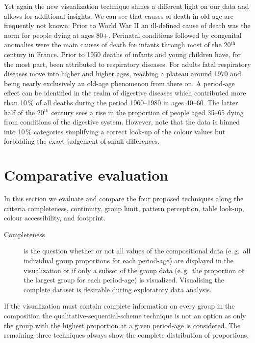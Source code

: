 \documentclass[parskip=half]{scrartcl}
\begin{document}
Yet again the new visualization technique shines a different light on our data and allows for additional insights. We can see that causes of death in old age are frequently not known: Prior to World War II an ill-defined cause of death was the norm for people dying at ages 80+. Perinatal conditions followed by congenital anomalies were the main causes of death for infants through most of the 20$^\text{th}$ century in France. Prior to 1950 deaths of infants and young children have, for the most part, been attributed to respiratory diseases. For adults fatal respiratory diseases move into higher and higher ages, reaching a plateau around 1970 and being nearly exclusively an old-age phenomenon from there on. A period-age effect can be identified in the realm of digestive diseases which contributed more than 10\,\% of all deaths during the period 1960--1980 in ages 40--60. The latter half of the 20$^\text{th}$ century sees a rise in the proportion of people aged 35--65 dying from conditions of the digestive system. However, note that the data is binned into 10\,\% categories simplifying a correct look-up of the colour values but forbidding the exact judgement of small differences.

\clearpage

\section{Comparative evaluation} %
\label{sec:eval}

In this section we evaluate and compare the four proposed techniques along the criteria completeness, continuity, group limit, pattern perception, table look-up, colour accessibility, and footprint.

\begin{description}
  \item[Completeness] is the question whether or not all values of the compositional data (e.\,g.~all individual group proportions for each period-age) are displayed in the visualization or if only a subset of the group data (e.\,g.~the proportion of the largest group for each period-age) is visualized. Visualising the complete dataset is desirable during exploratory data analysis.
\end{description}

If the visualization must contain complete information on every group in the composition the qualitative-sequential-scheme technique is not an option as only the group with the highest proportion at a given period-age is considered. The remaining three techniques always show the complete distribution of proportions.
\end{document}
